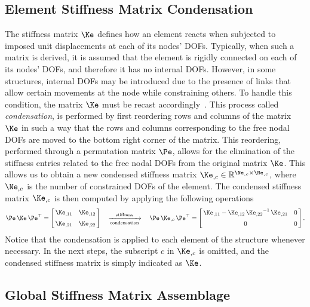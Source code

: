 \subsection{Element Stiffness Matrix Condensation}

The stiffness matrix $\Ke$ defines how an element reacts when subjected to imposed unit displacements at each of its nodes' \acp{DOF}. Typically, when such a matrix is derived, it is assumed that the element is rigidly connected on each of its nodes' \acp{DOF}, and therefore it has no internal \acp{DOF}. However, in some structures, internal \acp{DOF} may be introduced due to the presence of links that allow certain movements at the node while constraining others. To handle this condition, the matrix $\Ke$ must be recast accordingly~\cite{logan2002first}. This process called \emph{condensation}, is performed by first reordering rows and columns of the matrix $\Ke$ in such a way that the rows and columns corresponding to the free nodal \acp{DOF} are moved to the bottom right corner of the matrix. This reordering, performed through a permutation matrix $\Pe$, allows for the elimination of the stiffness entries related to the free nodal \acp{DOF} from the original matrix $\Ke$. This allows us to obtain a new condensed stiffness matrix ${\Ke}_{,c} \in \mathbb{R}^{{\Ne}_{,c} \times {\Ne}_{,c}}$, where ${\Ne}_{,c}$ is the number of constrained \acp{DOF} of the element. The condensed stiffness matrix ${\Ke}_{,c}$ is then computed by applying the following operations
%
\begin{equation}
  \Pe \, \Ke \, \Pe^\top= \left[\,\begin{matrix}
    {\Ke}_{,11} & {\Ke}_{,12} \\[0.5em]
    {\Ke}_{,21} & {\Ke}_{,22}
  \end{matrix}\,\right] \quad \xrightarrow[\text{condensation}]{\text{stiffness}} \quad
   \Pe \, {\Ke}_{,c} \, \Pe^\top = \left[\,\begin{matrix}
    {\Ke}_{,11} - {\Ke}_{,12} \, {{\Ke}_{,22}}^{-1} \, {\Ke}_{,21} & 0 \\[0.5em]
    0 & 0
  \end{matrix}\,\right] \text{.}
\end{equation}
%
Notice that the condensation is applied to each element of the structure whenever necessary. In the next steps, the subscript $c$ in ${\Ke}_{,c}$ is omitted, and the condensed stiffness matrix is simply indicated as $\Ke$.

\subsection{Global Stiffness Matrix Assemblage}

